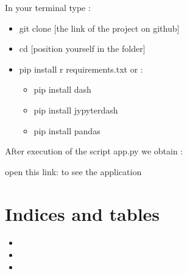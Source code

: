 \documentclass[letterpaper,10pt,english]{sphinxmanual}
\begin{document}
\sphinxAtStartPar
{}

\sphinxAtStartPar
In your terminal type :
\begin{itemize}
\item {} 
\sphinxAtStartPar
git clone {[}the link of the project on github{]}

\item {} 
\sphinxAtStartPar
cd {[}position yourself in the folder{]}

\item {} 
\sphinxAtStartPar
pip install \sphinxhyphen{}r requirements.txt or :
\begin{itemize}
\item {} 
\sphinxAtStartPar
pip install dash

\item {} 
\sphinxAtStartPar
pip install jypyter\sphinxhyphen{}dash

\item {} 
\sphinxAtStartPar
pip install pandas

\end{itemize}

\end{itemize}

\sphinxAtStartPar
{}

\sphinxAtStartPar
{}

\sphinxAtStartPar
After execution of the script app.py we obtain :

\sphinxAtStartPar
open this link:  to see the application


\chapter{Indices and tables}
\label{\detokenize{index:indices-and-tables}}\begin{itemize}
\item {} 
\sphinxAtStartPar
{}

\item {} 
\sphinxAtStartPar
{}

\item {} 
\sphinxAtStartPar
{}

\end{itemize}



\renewcommand{\indexname}{Index}
\printindex
\end{document}
